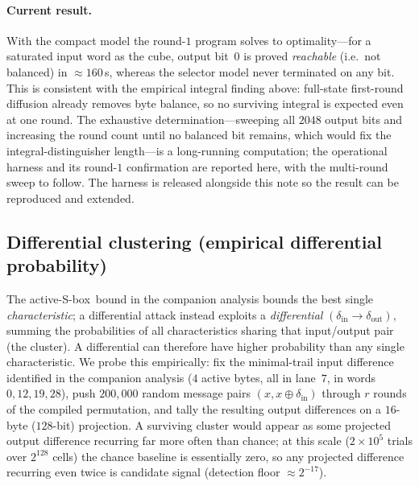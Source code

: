 \documentclass[11pt]{article}
\newcommand{\sbx}{S\nobreakdash-box}
\begin{document}
\paragraph{Current result.} With the compact model the round-$1$ program solves
to optimality---for a saturated input word as the cube, output bit~$0$ is proved
\emph{reachable} (i.e.\ not balanced) in $\approx\!160$\,s, whereas the selector
model never terminated on any bit. This is consistent with the empirical integral
finding above: full-state first-round diffusion already removes byte balance, so
no surviving integral is expected even at one round. The exhaustive
determination---sweeping all $2048$ output bits and increasing the round count
until no balanced bit remains, which would fix the integral-distinguisher
length---is a long-running computation; the operational harness and its round-$1$
confirmation are reported here, with the multi-round sweep to follow. The harness
is released alongside this note so the result can be reproduced and extended.

\subsection{Differential clustering (empirical differential probability)}
The active-\sbx\ bound in the companion analysis bounds the best single
\emph{characteristic}; a differential attack instead exploits a \emph{differential}
$(\delta_{\text{in}}\!\to\!\delta_{\text{out}})$, summing the probabilities of all
characteristics sharing that input/output pair (the cluster). A differential can
therefore have higher probability than any single characteristic. We probe this
empirically: fix the minimal-trail input difference identified in the companion
analysis ($4$ active bytes, all in lane~$7$, in words $0,12,19,28$), push
$200{,}000$ random message pairs $(x, x\oplus\delta_{\text{in}})$ through $r$
rounds of the compiled permutation, and tally the resulting output differences on
a $16$-byte ($128$-bit) projection. A surviving cluster would appear as some
projected output difference recurring far more often than chance; at this scale
($2\times10^5$ trials over $2^{128}$ cells) the chance baseline is essentially
zero, so any projected difference recurring even twice is candidate signal
(detection floor $\approx 2^{-17}$).
\end{document}
